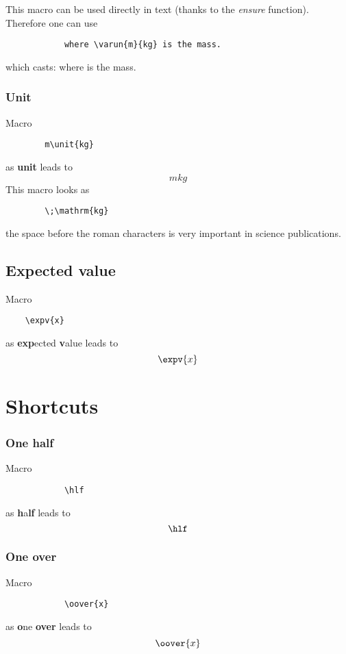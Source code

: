 \documentclass{article}
\begin{document}
		This macro can be used directly in text (thanks to the \textit{ensure} function). Therefore one can use
		\begin{lstlisting}
			where \varun{m}{kg} is the mass.
		\end{lstlisting}
		which casts: where  is the mass.
		
		\subsubsection*{Unit}
		Macro
		\begin{lstlisting}
		m\unit{kg}
		\end{lstlisting}
		as \textbf{unit} leads to 
		\begin{equation*}
			m\unit{kg}
		\end{equation*}
		This macro looks as
		\begin{lstlisting}
		\;\mathrm{kg}
		\end{lstlisting}
		the space before the roman characters is very important in science publications.
	
	\subsection*{Expected value}
	Macro
	\begin{lstlisting}
	\expv{x}
	\end{lstlisting}
	as \textbf{exp}ected \textbf{v}alue leads to 
	\begin{equation*}
		\expv{x}
	\end{equation*}
	
	\section*{Shortcuts}
		\subsubsection*{One half}
		Macro
		\begin{lstlisting}
			\hlf
		\end{lstlisting}
		as \textbf{h}a\textbf{lf} leads to 
		\begin{equation*}
			\hlf
		\end{equation*}
	
		\subsubsection*{One over }
		Macro
		\begin{lstlisting}
			\oover{x}
		\end{lstlisting}
		as \textbf{o}ne \textbf{over} leads to 
		\begin{equation*}
			\oover{x}
		\end{equation*} 
	
\end{document}
